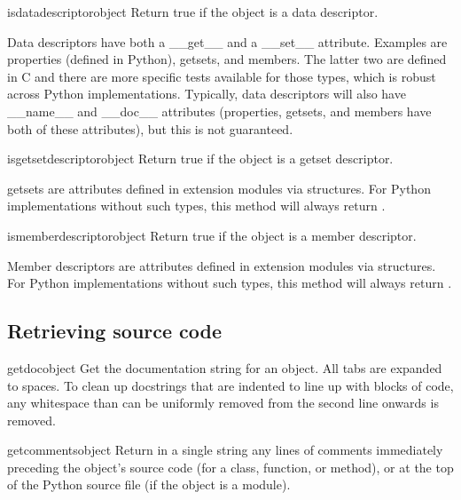 \begin{funcdesc}{isdatadescriptor}{object}
  Return true if the object is a data descriptor.

  Data descriptors have both a __get__ and a __set__ attribute.  Examples are
  properties (defined in Python), getsets, and members.  The latter two are
  defined in C and there are more specific tests available for those types,
  which is robust across Python implementations.  Typically, data descriptors
  will also have __name__ and __doc__ attributes (properties, getsets, and
  members have both of these attributes), but this is not guaranteed.
\end{funcdesc}

\begin{funcdesc}{isgetsetdescriptor}{object}
  Return true if the object is a getset descriptor.

  getsets are attributes defined in extension modules via 
  structures.  For Python implementations without such types, this method will
  always return .
\end{funcdesc}

\begin{funcdesc}{ismemberdescriptor}{object}
  Return true if the object is a member descriptor.

  Member descriptors are attributes defined in extension modules via
   structures.  For Python implementations without such
  types, this method will always return .
\end{funcdesc}

\subsection{Retrieving source code
            \label{inspect-source}}

\begin{funcdesc}{getdoc}{object}
  Get the documentation string for an object.
  All tabs are expanded to spaces.  To clean up docstrings that are
  indented to line up with blocks of code, any whitespace than can be
  uniformly removed from the second line onwards is removed.
\end{funcdesc}

\begin{funcdesc}{getcomments}{object}
  Return in a single string any lines of comments immediately preceding
  the object's source code (for a class, function, or method), or at the
  top of the Python source file (if the object is a module).
\end{funcdesc}

